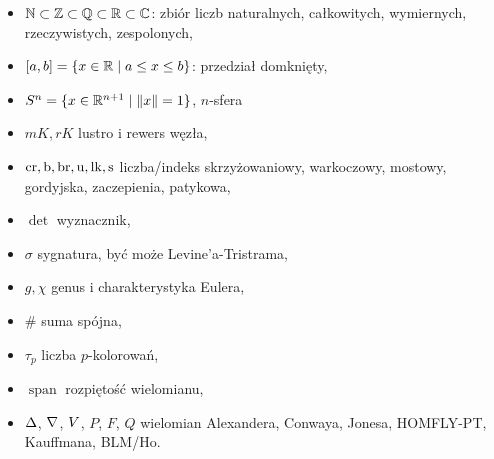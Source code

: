
\begin{itemize}
    \item $\mathbb N \subset \mathbb Z \subset \mathbb Q \subset \mathbb R \subset \mathbb C$: zbiór liczb naturalnych, całkowitych, wymiernych, rzeczywistych, zespolonych,
    \item $[a, b] = \{x \in \mathbb R \mid a \le x \le b\}$: przedział domknięty,
    \item $S^n = \{x \in \mathbb R^{n+1} \mid \|x\| = 1\}$, $n$-sfera
    \item $mK, rK$ lustro i rewers węzła,
    \item $\operatorname{cr}, \operatorname{b}, \operatorname{br}, \operatorname{u}, \operatorname{lk}, \operatorname{s}$ liczba/indeks skrzyżowaniowy, warkoczowy, mostowy, gordyjska, zaczepienia, patykowa,
    \item $\det$ wyznacznik,
    \item $\sigma$ sygnatura, być może Levine'a-Tristrama,
    \item $g, \chi$ genus i charakterystyka Eulera,
    \item $\#$ suma spójna,
    \item $\tau_p$ liczba $p$-kolorowań,
    \item $\operatorname{span}$ rozpiętość wielomianu,
    \item $\Delta$, $\nabla$, $V$, $P$, $F$, $Q$ wielomian Alexandera, Conwaya, Jonesa, HOMFLY-PT, Kauffmana, BLM/Ho.
\end{itemize}


